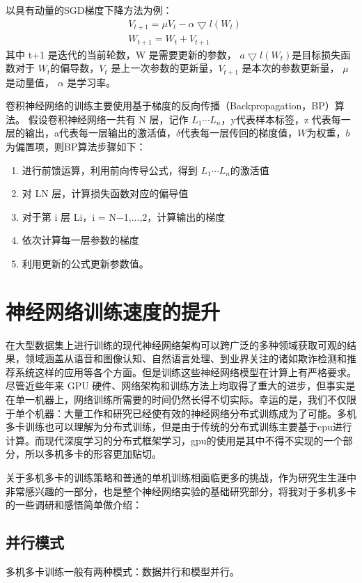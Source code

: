 以具有动量的SGD梯度下降方法为例：
\begin{equation}
\begin{split}
&V_{t+1}=\mu V_t-\alpha \bigtriangledown l(W_t) \\
&W_{t+1}=W_t+V_{t+1}
\end{split}
\end{equation}
其中 t+1 是迭代的当前轮数，W 是需要更新的参数， $a \bigtriangledown l(W_t)$是目标损失函数对于 $W_t$的偏导数，$V_t$ 是上一次参数的更新量，$V_{t+1}$ 是本次的参数更新量， $\mu$ 是动量值， $\alpha$ 是学习率。

卷积神经网络的训练主要使用基于梯度的反向传播（Backpropagation，BP）算法。 假设卷积神经网络一共有 N 层，记作 $L_1\cdots L_n$，y代表样本标签，z 代表每一层的输出，a代表每一层输出的激活值，$\delta$代表每一层传回的梯度值，$W$为权重，$b$为偏置项，则BP算法步骤如下：
\begin{enumerate}
\item 进行前馈运算，利用前向传导公式，得到 $L_1\cdots L_n$的激活值
\item 对 LN 层，计算损失函数对应的偏导值
\item 对于第 i 层 Li，i = N−1,...,2，计算输出的梯度
\item 依次计算每一层参数的梯度
\item 利用更新的公式更新参数值。
\end{enumerate}

\section{神经网络训练速度的提升}
在大型数据集上进行训练的现代神经网络架构可以跨广泛的多种领域获取可观的结果，领域涵盖从语音和图像认知、自然语言处理、到业界关注的诸如欺诈检测和推荐系统这样的应用等各个方面。但是训练这些神经网络模型在计算上有严格要求。尽管近些年来 GPU\cite{CUDA} 硬件、网络架构和训练方法上均取得了重大的进步，但事实是在单一机器上，网络训练所需要的时间仍然长得不切实际。幸运的是，我们不仅限于单个机器：大量工作和研究已经使有效的神经网络分布式训练成为了可能。多机多卡训练也可以理解为分布式训练，但是由于传统的分布式训练主要基于cpu进行计算。而现代深度学习的分布式框架学习，gpu的使用是其中不得不实现的一个部分，所以多机多卡的形容更加贴切。

关于多机多卡的训练策略和普通的单机训练相面临更多的挑战，作为研究生生涯中非常感兴趣的一部分，也是整个神经网络实验的基础研究部分，将我对于多机多卡的一些调研和感悟简单做介绍：
\subsection{并行模式}
多机多卡训练一般有两种模式：数据并行和模型并行。

